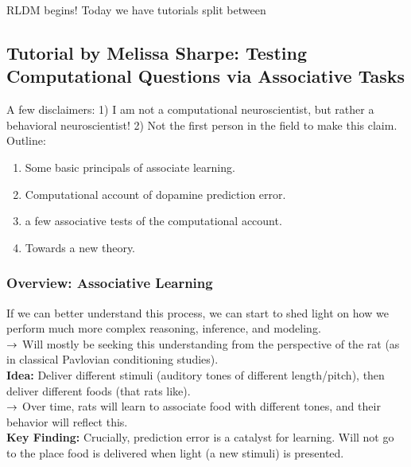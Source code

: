RLDM begins! Today we have tutorials split between

\subsection{Tutorial by Melissa Sharpe: Testing Computational Questions via Associative Tasks}


A few disclaimers: 1) I am not a computational neuroscientist, but rather a behavioral neuroscientist! 2) Not the first person in the field to make this claim. \\

Outline:
\begin{enumerate}
    \item Some basic principals of associate learning.
    \item Computational account of dopamine prediction error.
    \item a few associative tests of the computational account.
    \item Towards a new theory.
\end{enumerate}


\subsubsection{Overview: Associative Learning}



If we can better understand this process, we can start to shed light on how we perform much more complex reasoning, inference, and modeling. \\

$\rightarrow$ Will mostly be seeking this understanding from the perspective of the rat (as in classical Pavlovian conditioning studies). \\

{\bf Idea:} Deliver different stimuli (auditory tones of different length/pitch), then deliver different foods (that rats like). \\

$\rightarrow$ Over time, rats will learn to associate food with different tones, and their behavior will reflect this. \\

{\bf Key Finding:} Crucially, prediction error is a catalyst for learning. Will not go to the place food is delivered when light (a new stimuli) is presented. \\

